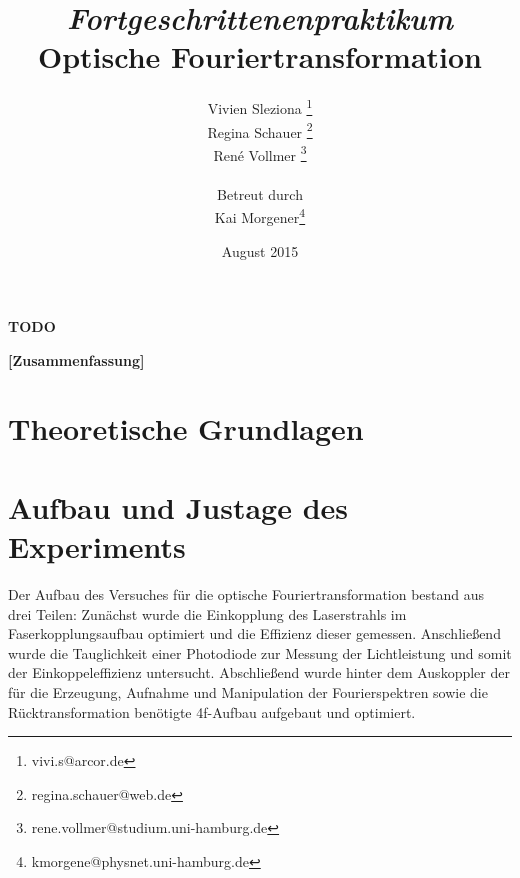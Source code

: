 \documentclass[12pt,a4paper]{article}
\begin{document}
	
	\textbf{TODO}
	
	
	
	\title{\textit{Fortgeschrittenenpraktikum}\\\textbf{Optische Fouriertransformation} }
	\date{August 2015}
	\author{Vivien Sleziona \footnote{vivi.s@arcor.de}\\ Regina Schauer \footnote{regina.schauer@web.de}\\ René Vollmer \footnote{rene.vollmer@studium.uni-hamburg.de} \\ \\Betreut durch\\ Kai Morgener\footnote{kmorgene@physnet.uni-hamburg.de}}
	
	\maketitle
	
	\begin{center} 
		\bigskip
		\bigskip
		
		\begin{minipage}{0.75\textwidth}
			\textbf{[Zusammenfassung]}
			
		\end{minipage}
	\end{center}
	
	\newpage
	
	\tableofcontents
	\vfill
	\newpage
	\clearpage	
	
	
	\section{Theoretische Grundlagen}
	

	
	\newpage
	\clearpage
	\section{Aufbau und Justage des Experiments}
	Der Aufbau des Versuches für die optische Fouriertransformation bestand aus drei Teilen: Zunächst wurde die Einkopplung des Laserstrahls im Faserkopplungsaufbau optimiert und die Effizienz dieser gemessen. Anschließend wurde die Tauglichkeit einer Photodiode zur Messung der Lichtleistung und somit der Einkoppeleffizienz untersucht. Abschließend wurde hinter dem Auskoppler der für die Erzeugung, Aufnahme und Manipulation der Fourierspektren sowie die Rücktransformation benötigte 4f-Aufbau aufgebaut und optimiert.
	
\end{document}
